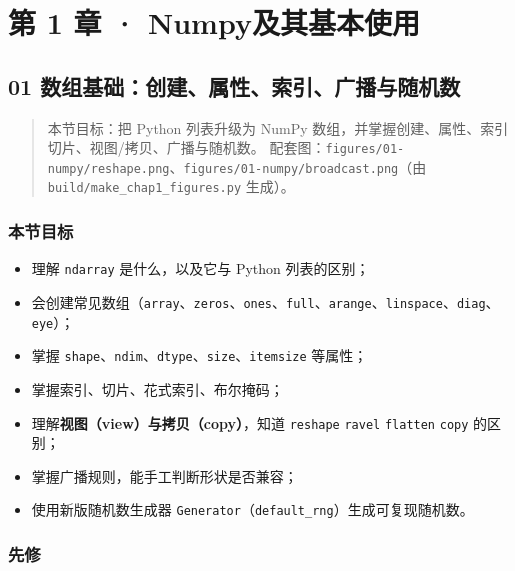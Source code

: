 \chapter{第 1 章 ·
Numpy及其基本使用}\label{ux7b2c-1-ux7ae0-numpyux53caux5176ux57faux672cux4f7fux7528}

\section{01
数组基础：创建、属性、索引、广播与随机数}\label{ux6570ux7ec4ux57faux7840ux521bux5efaux5c5eux6027ux7d22ux5f15ux5e7fux64adux4e0eux968fux673aux6570}

\begin{quote}
本节目标：把 Python 列表升级为 NumPy
数组，并掌握创建、属性、索引切片、视图/拷贝、广播与随机数。
配套图：\texttt{figures/01-numpy/reshape.png}、\texttt{figures/01-numpy/broadcast.png}（由
\texttt{build/make\_chap1\_figures.py} 生成）。
\end{quote}

\subsection{本节目标}\label{ux672cux8282ux76eeux6807-7}

\begin{itemize}
\tightlist
\item
  理解 \texttt{ndarray} 是什么，以及它与 Python 列表的区别；
\item
  会创建常见数组（\texttt{array}、\texttt{zeros}、\texttt{ones}、\texttt{full}、\texttt{arange}、\texttt{linspace}、\texttt{diag}、\texttt{eye}）；
\item
  掌握
  \texttt{shape}、\texttt{ndim}、\texttt{dtype}、\texttt{size}、\texttt{itemsize}
  等属性；
\item
  掌握索引、切片、花式索引、布尔掩码；
\item
  理解\textbf{视图（view）与拷贝（copy）}，知道 \texttt{reshape}
  \texttt{ravel} \texttt{flatten} \texttt{copy} 的区别；
\item
  掌握广播规则，能手工判断形状是否兼容；
\item
  使用新版随机数生成器
  \texttt{Generator}（\texttt{default\_rng}）生成可复现随机数。
\end{itemize}

\subsection{先修}\label{ux5148ux4fee}

